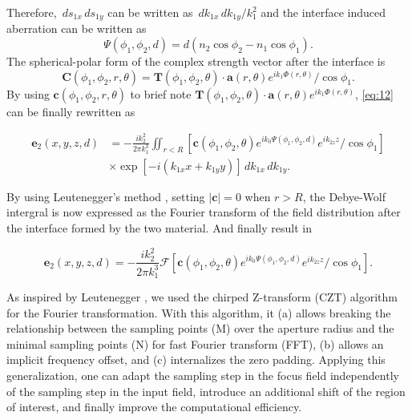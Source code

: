 \documentclass[9pt,twocolumn,twoside]{osajnl}
\begin{document}
Therefore, $\,ds_{1x}\,ds_{1y}$ can be written as $\,dk_{1x}\,dk_{1y}/k_1^2$ and the interface induced aberration can be written as 
\begin{equation}\label{eq:14}
	\Psi(\phi_1,\phi_2,d)=d(n_2\cos\phi_2-n_1\cos\phi_1).
\end{equation}
The spherical-polar form of the complex strength vector after the interface is
\begin{equation}\label{eq:15}
	\mathbf{C}(\phi_1,\phi_2,r,\theta)=\mathbf{T}(\phi_1,\phi_2,\theta)\cdot\mathbf{a}(r,\theta)e^{ik_1\Phi(r,\theta)}/\cos\phi_1.
\end{equation}
By using $\mathbf{c}(\phi_1,\phi_2,r,\theta)$ to brief note $\mathbf{T}(\phi_1,\phi_2,\theta)\cdot\mathbf{a}(r,\theta)e^{ik_1\Phi(r,\theta)}$, \eqref{eq:12} can be finally rewritten as

\begin{equation}
	\begin{aligned}\label{eq:16}
		\mathbf{e}_2(x,y,z,d)&=-\frac{ik^2_2}{2\pi k^3_1}
		\iint_{r<R}[\mathbf{c}(\phi_1,\phi_2,\theta)e^{ik_0\Psi(\phi_1,\phi_2,d)}e^{ik_{2z}z}/\cos\phi_1]\\
		&\times \exp[-i(k_{1x}x+k_{1y}y)]\,dk_{1x}\,dk_{1y}.
	\end{aligned}
\end{equation}

By using Leutenegger's method \cite{leutenegger2006fast}, setting $|\mathbf{c}|=0$ when $r>R$, the Debye-Wolf intergral is now expressed as the Fourier transform of the field distribution after the interface formed by the two material. And finally result in

\begin{equation}\label{eq:17}
	\mathbf{e}_2(x,y,z,d)=-\frac{ik^2_2}{2\pi k^3_1}\mathcal{F}[\mathbf{c}(\phi_1,\phi_2,\theta)e^{ik_0\Psi(\phi_1,\phi_2,d)}e^{ik_{2z}z}/\cos\phi_1].
\end{equation}

As inspired by Leutenegger \cite{leutenegger2006fast}, we used the chirped Z-transform (CZT) algorithm \cite{Bakx2002} for the Fourier transformation. With this algorithm, it (a) allows breaking the relationship between the sampling points (M) over the aperture radius and the minimal sampling points (N) for fast Fourier transform (FFT), (b) allows an implicit frequency offset, and (c) internalizes the zero padding. Applying this generalization, one can adapt the sampling step in the focus field independently of the sampling step in the input field, introduce an additional shift of the region of interest, and finally improve the computational efficiency.
\end{document}
